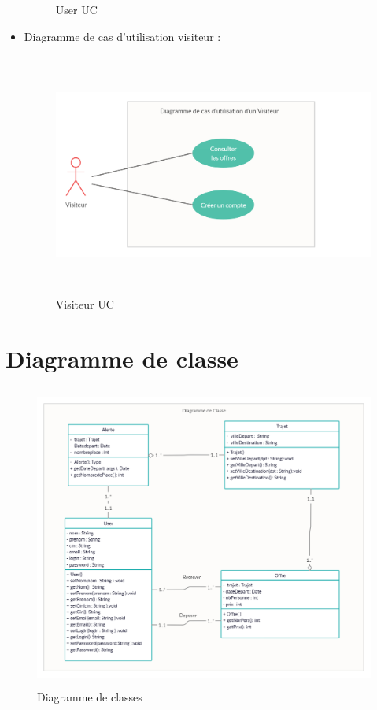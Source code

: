 \documentclass[a4paper]{report}
\begin{document}
\begin{spacing}{2}
\begin{itemize}
\begin{figure}[!ht]
\begin{center}
\end{center}
\caption[User UC]{User UC}
\end{figure}
 \cleardoublepage
\item Diagramme de cas d’utilisation visiteur :
\begin{figure}[!ht]
\begin{center}
\includegraphics[height=8cm]{Projet_JEE/VisiteurUC.png}
\end{center}
\caption[Visiteur UC]{Visiteur UC}
\end{figure}
\cleardoublepage
 
\end{itemize}

\section{Diagramme de classe}
\begin{figure}[!ht]
\begin{center}
\includegraphics[height=10cm]{Projet_JEE/Diagramme de Classe.jpg}
\end{center}
\caption[Diagramme de classes]{Diagramme de classes}
\end{figure}
 

\end{spacing}
\end{document}
